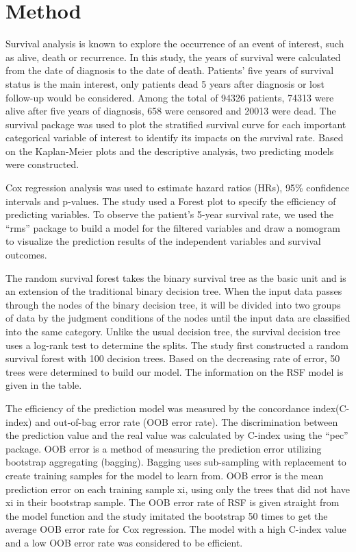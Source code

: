 \documentclass[
  12pt,
]{article}
\begin{document}
\hypertarget{method}{%
\section{Method}\label{method}}

Survival analysis is known to explore the occurrence of an event of
interest, such as alive, death or recurrence. In this study, the years
of survival were calculated from the date of diagnosis to the date of
death. Patients' five years of survival status is the main interest,
only patients dead 5 years after diagnosis or lost follow-up would be
considered. Among the total of 94326 patients, 74313 were alive after
five years of diagnosis, 658 were censored and 20013 were dead. The
survival package was used to plot the stratified survival curve for each
important categorical variable of interest to identify its impacts on
the survival rate. Based on the Kaplan-Meier plots and the descriptive
analysis, two predicting models were constructed.

Cox regression analysis was used to estimate hazard ratios (HRs), 95\%
confidence intervals and p-values. The study used a Forest plot to
specify the efficiency of predicting variables. To observe the patient's
5-year survival rate, we used the ``rms'' package to build a model for
the filtered variables and draw a nomogram to visualize the prediction
results of the independent variables and survival outcomes.

The random survival forest takes the binary survival tree as the basic
unit and is an extension of the traditional binary decision tree. When
the input data passes through the nodes of the binary decision tree, it
will be divided into two groups of data by the judgment conditions of
the nodes until the input data are classified into the same category.
Unlike the usual decision tree, the survival decision tree uses a
log-rank test to determine the splits. The study first constructed a
random survival forest with 100 decision trees. Based on the decreasing
rate of error, 50 trees were determined to build our model. The
information on the RSF model is given in the table.

The efficiency of the prediction model was measured by the concordance
index(C-index) and out-of-bag error rate (OOB error rate). The
discrimination between the prediction value and the real value was
calculated by C-index using the ``pec'' package. OOB error is a method
of measuring the prediction error utilizing bootstrap aggregating
(bagging). Bagging uses sub-sampling with replacement to create training
samples for the model to learn from. OOB error is the mean prediction
error on each training sample xi, using only the trees that did not have
xi in their bootstrap sample. The OOB error rate of RSF is given
straight from the model function and the study imitated the bootstrap 50
times to get the average OOB error rate for Cox regression. The model
with a high C-index value and a low OOB error rate was considered to be
efficient.
\end{document}
